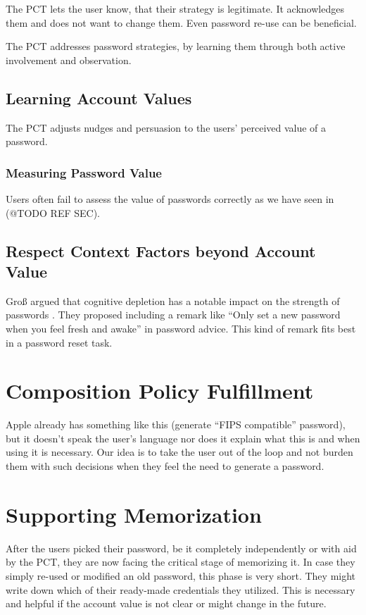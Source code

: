 The PCT lets the user know, that their strategy is legitimate. It acknowledges them and does not want to change them.  Even password re-use can be beneficial.

The PCT addresses password strategies, by learning them through both active involvement and observation. 


\subsection{Learning Account Values}
The PCT adjusts nudges and persuasion to the users' perceived value of a password. 

\subsubsection{Measuring Password Value}
Users often fail to assess the value of passwords correctly as we have seen in (@TODO REF SEC). 

\subsection{Respect Context Factors beyond Account Value}
Groß \etal argued that cognitive depletion has a notable impact on the strength of passwords \cite{Gross2016EffectCognitiveEffort}. They proposed including a remark like ``Only set a new password when you feel fresh and awake'' in password advice. This kind of remark fits best in a password reset task. 


\section{Composition Policy Fulfillment}
Apple already has something like this (generate ``FIPS compatible'' password), but it doesn't speak the user's language nor does it explain what this is and when using it is necessary. Our idea is to take the user out of the loop and not burden them with such decisions when they feel the need to generate a password. 

\section{Supporting Memorization}
After the users picked their password, be it completely independently or with aid by the PCT, they are now facing the critical stage of memorizing it. In case they simply re-used or modified an old password, this phase is very short. They might write down which of their ready-made credentials they utilized. This is necessary and helpful if the account value is not clear or might change in the future. 

